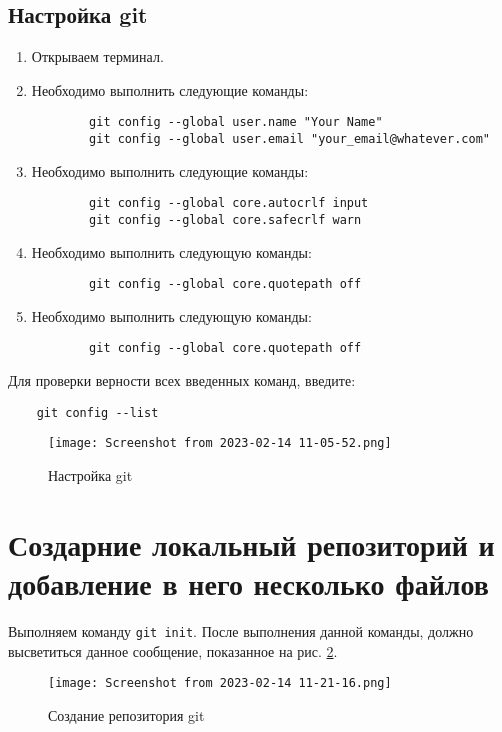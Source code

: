 \subsection{Настройка git}
\begin{enumerate}
	\item Открываем терминал.
	\item Необходимо выполнить следующие команды:
	\begin{verbatim}
		git config --global user.name "Your Name"
		git config --global user.email "your_email@whatever.com"
	\end{verbatim}
	\item Необходимо выполнить следующие команды:
	\begin{verbatim}
		git config --global core.autocrlf input
		git config --global core.safecrlf warn
	\end{verbatim}
	\item Необходимо выполнить следующую команды:
	\begin{verbatim}
		git config --global core.quotepath off
	\end{verbatim}
	\item Необходимо выполнить следующую команды:
	\begin{verbatim}
		git config --global core.quotepath off
	\end{verbatim}
\end{enumerate}
Для проверки верности всех введенных команд, введите:
\begin{verbatim}
	git config --list
\end{verbatim}
\begin{figure}[h!tp]
	\centering
	\texttt{[image: Screenshot from 2023-02-14 11-05-52.png]}
	\caption{Настройка git}
	\label{fig:git:config}
\end{figure}

\section{Создарние локальный репозиторий и добавление в него несколько файлов}
Выполняем команду \texttt{git init}.
После выполнения данной команды, должно высветиться данное сообщение, показанное на рис. \ref{fig:git:init}.
\begin{figure}[h!tp]
	\centering
	\texttt{[image: Screenshot from 2023-02-14 11-21-16.png]}
	\caption{Создание репозитория git}
	\label{fig:git:init}
\end{figure}

